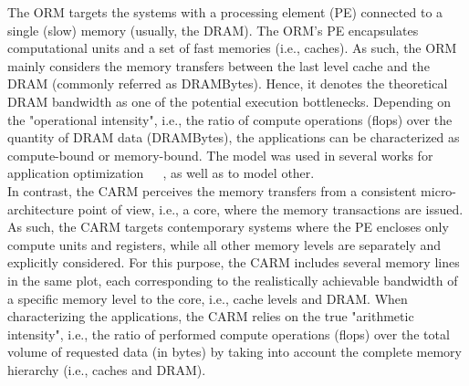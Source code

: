 \documentclass[twoside,twocolumn,8pt]{extarticle}
\begin{document}
The ORM targets the systems with a processing element (PE) connected to a single (slow) memory (usually, the DRAM). The ORM's
PE encapsulates computational units and a set of fast memories (i.e., caches). As such, the ORM mainly considers the memory
transfers between the last level cache and the DRAM (commonly referred as DRAMBytes). Hence, it denotes the theoretical DRAM
bandwidth as one of the potential execution bottlenecks. Depending on the "operational intensity", i.e., the ratio of compute
operations (flops) over the quantity of DRAM data (DRAMBytes), the applications can be characterized as compute-bound or
memory-bound. The model was used in several works for application
optimization~\cite{Kim20111201}~\cite{Rossinelli2164}~\cite{vanNieuwpoort:2009:UMH:1542275.1542337}, as well as to model other.\\


In contrast, the CARM perceives the memory transfers from a consistent micro-architecture point of view, i.e., a core, where
the memory transactions are issued. As such, the CARM targets contemporary systems where the PE encloses only compute units
and registers, while all other memory levels are separately and explicitly considered. For this purpose, the CARM includes several
memory lines in the same plot, each corresponding to the realistically achievable bandwidth of a specific memory level to the core,
i.e., cache levels and DRAM. When characterizing the applications, the CARM relies on the true "arithmetic intensity", i.e., the
ratio of performed compute operations (flops) over the total volume of requested data (in bytes) by taking into account the
complete memory hierarchy (i.e., caches and DRAM).\\
\end{document}
